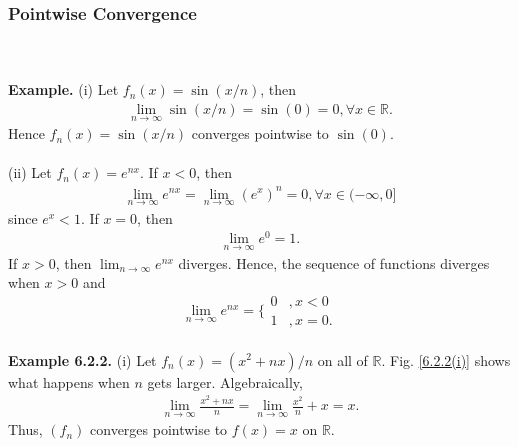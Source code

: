 \documentclass{article}
\begin{document}
           \subsubsection{Pointwise Convergence} 
           \\ \\
           \textbf{Example.} (i) Let $f_n(x) = \sin(x/n)$, then
           \begin{align*}
               \lim_{n \to \infty} \sin(x/n) = \sin(0) = 0, \forall x \in \mathbb{R}.
           \end{align*}
           Hence $f_n(x) = \sin(x/n)$ converges pointwise to $\sin(0)$.
           \\ \\
           (ii) Let $f_n(x) = e^{nx}$. 
           If $x < 0$, then
           \begin{align*}
               \lim_{n \to \infty} e^{nx} = \lim_{n \to \infty} (e^x)^n  = 0, \forall x \in (-\infty,0]
           \end{align*}
           since $e^x<1$. If $x=0$, then
           \begin{align*}
               \lim_{n \to \infty} e^{0}  = 1.
           \end{align*}
           If $x>0$, then $\lim_{n \to \infty} e^{nx}$ diverges. Hence, the sequence of functions diverges when $x>0$ and
           \begin{equation*}
               \lim_{n \to \infty} e^{nx} = \bigg\{ \begin{matrix} 0 & ,x < 0 \\ 1 & ,x=0. \end{matrix}
           \end{equation*}
           \\
           \textbf{Example 6.2.2.} (i) Let $f_n(x) = (x^2+nx)/n$ on all of $\mathbb{R}$. Fig. \ref{6.2.2(i)} shows what happens when $n$ gets larger. Algebraically,
           \begin{align*}
               \lim_{n \to \infty} \frac{x^2+nx}{n} = \lim_{n \to \infty} \frac{x^2}{n} + x = x.
           \end{align*}
           Thus, $(f_n)$ converges pointwise to $f(x)=x$ on $\mathbb{R}$.
           \\ \\
\end{document}
